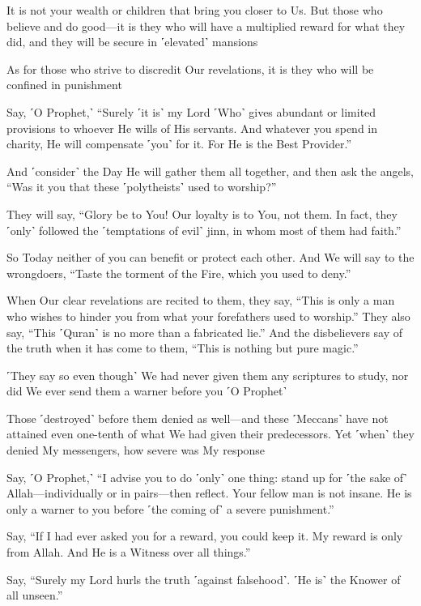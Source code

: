 It is not your wealth or children that bring you closer to Us. But those who believe and do good—it is they who will have a multiplied reward for what they did, and they will be secure in ˹elevated˺ mansions

As for those who strive to discredit Our revelations, it is they who will be confined in punishment

Say, ˹O Prophet,˺ “Surely ˹it is˺ my Lord ˹Who˺ gives abundant or limited provisions to whoever He wills of His servants. And whatever you spend in charity, He will compensate ˹you˺ for it. For He is the Best Provider.”

And ˹consider˺ the Day He will gather them all together, and then ask the angels, “Was it you that these ˹polytheists˺ used to worship?”

They will say, “Glory be to You! Our loyalty is to You, not them. In fact, they ˹only˺ followed the ˹temptations of evil˺ jinn, in whom most of them had faith.”

So Today neither of you can benefit or protect each other. And We will say to the wrongdoers, “Taste the torment of the Fire, which you used to deny.”

When Our clear revelations are recited to them, they say, “This is only a man who wishes to hinder you from what your forefathers used to worship.” They also say, “This ˹Quran˺ is no more than a fabricated lie.” And the disbelievers say of the truth when it has come to them, “This is nothing but pure magic.”

˹They say so even though˺ We had never given them any scriptures to study, nor did We ever send them a warner before you ˹O Prophet˺

Those ˹destroyed˺ before them denied as well—and these ˹Meccans˺ have not attained even one-tenth of what We had given their predecessors. Yet ˹when˺ they denied My messengers, how severe was My response

Say, ˹O Prophet,˺ “I advise you to do ˹only˺ one thing: stand up for ˹the sake of˺ Allah—individually or in pairs—then reflect. Your fellow man is not insane. He is only a warner to you before ˹the coming of˺ a severe punishment.”

Say, “If I had ever asked you for a reward, you could keep it. My reward is only from Allah. And He is a Witness over all things.”

Say, “Surely my Lord hurls the truth ˹against falsehood˺. ˹He is˺ the Knower of all unseen.”

